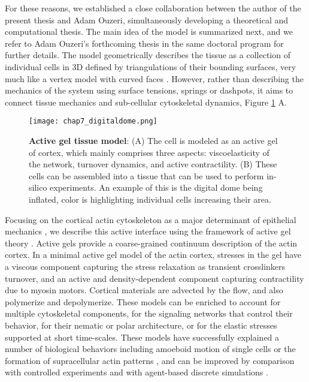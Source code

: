 For these reasons, we established a close collaboration between the author of the present thesis and Adam Ouzeri, simultaneously developing a theoretical and computational thesis. The main idea of the model is summarized next, and we refer to Adam Ouzeri's forthcoming thesis in the same doctoral program for further details. The model geometrically describes the tissue as a collection of individual cells in 3D defined by triangulations of their bounding surfaces, very much like a vertex model with curved faces \cite{alt2017,perez-gonzalez2021}. However, rather than describing the mechanics of the system using surface tensions, springs or dashpots, it aims to connect tissue mechanics and sub-cellular cytoskeletal dynamics, Figure \ref{fig_7_2} A. 

\begin{figure}
	\centering
	\texttt{[image: chap7\_digitaldome.png]}
	\caption{\label{fig_7_2} \textbf{Active gel tissue model}: (A) The cell is modeled as an active gel of cortex, which mainly comprises three aspects: viscoelasticity of the network, turnover dynamics, and active contractility. (B) These cells can be assembled into a tissue that can be used to perform in-silico experiments. An example of this is the digital dome being inflated, color is highlighting individual cells increasing their area.}
\end{figure}


Focusing on the cortical actin cytoskeleton as a major determinant of epithelial mechanics \cite{latorre2018,khalilgharibi2019,duque2023}, we describe this active interface using the framework of active gel theory \cite{Prost:2015aa}. Active gels provide a coarse-grained continuum description of the actin cortex. In a minimal active gel model of the actin cortex, stresses in the gel have a viscous component capturing the stress relaxation as transient crosslinkers turnover, and an active and density-dependent component capturing contractility due to myosin motors. Cortical materials are advected by the flow, and also polymerize and depolymerize. These models can be enriched to account for multiple cytoskeletal components, for the signaling networks that control their behavior, for their nematic or polar architecture, or for the elastic stresses supported at short time-scales. These models have successfully explained a number of biological behaviors including amoeboid motion of single cells \cite{callan2013} or the formation of supracellular actin patterns \cite{hannezo2015}, and can be improved by comparison with controlled experiments and with agent-based discrete simulations \cite{cortes2020}. 

